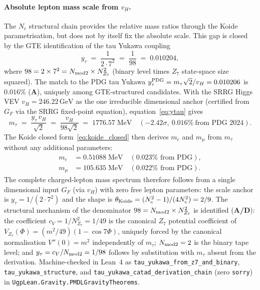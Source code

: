 \documentclass[11pt]{article}
\newcommand{\CatAD}{\textbf{A/D}}
\newcommand{\CatA}{\textbf{A}}
\theoremstyle{remark}
\begin{document}
\paragraph{Absolute lepton mass scale from $v_H$.}
The $N_c$ structural chain provides the relative mass ratios through the Koide parametrisation, but does not by itself fix the absolute scale.  This gap is closed by the GTE identification of the tau Yukawa coupling
\begin{equation}
y_\tau \;=\; \frac{1}{2 \cdot 7^2} \;=\; \frac{1}{98} \;=\; 0.010204,
\label{eq:ytau}
\end{equation}
where $98 = 2 \times 7^2 = N_{\rm mod2} \times N_{Z_7}^2$ (binary level times $Z_7$ state-space size squared).  The match to the PDG tau Yukawa $y_\tau^{\rm PDG} = m_\tau\sqrt{2}/v_H = 0.010206$ is $0.016\%$ (\CatA), uniquely among GTE-structured candidates.  With the SRRG Higgs VEV $v_H = 246.22\,\mathrm{GeV}$ as the one irreducible dimensional anchor (certified from $G_F$ via the SRRG fixed-point equation), equation~\eqref{eq:ytau} gives
\begin{equation}
m_\tau \;=\; \frac{y_\tau\, v_H}{\sqrt{2}} \;=\; \frac{v_H}{98\sqrt{2}} \;=\; 1776.57\;\text{MeV} \quad ({-2.42\sigma},\ 0.016\%\ \text{from PDG~2024}).
\label{eq:mtau_from_vH}
\end{equation}
The Koide closed form~\eqref{eq:koide_closed} then derives $m_e$ and $m_\mu$ from $m_\tau$ without any additional parameters:
\begin{align*}
m_e &= 0.51088\;\text{MeV} \quad (0.023\% \text{ from PDG}), \\
m_\mu &= 105.635\;\text{MeV} \quad (0.022\% \text{ from PDG}).
\end{align*}
The complete charged-lepton mass spectrum therefore follows from a single dimensional input $G_F$ (via $v_H$) with zero free lepton parameters: the scale anchor is $y_\tau = 1/(2 \cdot 7^2)$ and the shape is $\theta_{\rm Koide} = (N_c^2-1)/(4N_c^2) = 2/9$.  The structural mechanism of the denominator $98 = N_{\rm mod2} \times N_{Z_7}^2$ is identified (\CatAD): the coefficient $c_V = 1/N_{Z_7}^2 = 1/49$ is the canonical $Z_7$ potential coefficient of $V_{Z_7}(\Phi) = (m^2/49)(1-\cos 7\Phi)$, uniquely forced by the canonical normalisation $V''(0) = m^2$ independently of $m_\tau$; $N_{\rm mod2} = 2$ is the binary tape level; and $y_\tau = c_V/N_{\rm mod2} = 1/98$ follows by substitution with $m_\tau$ absent from the derivation.  Machine-checked in Lean~4 as \texttt{tau\_yukawa\_from\_z7\_and\_binary}, \texttt{tau\_yukawa\_structure}, and \texttt{tau\_yukawa\_catad\_derivation\_chain} (zero \texttt{sorry}) in \texttt{UgpLean.Gravity.PMDLGravityTheorems}.
\end{document}
